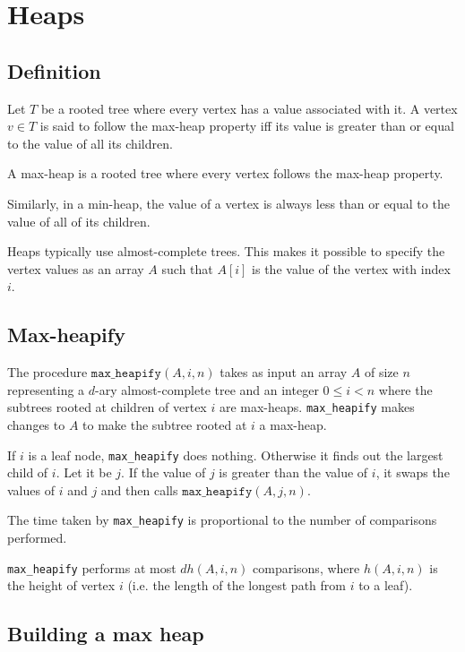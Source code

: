 \section{Heaps}

\subsection{Definition}

Let $T$ be a rooted tree where every vertex has a value associated with it.
A vertex $v \in T$ is said to follow the max-heap property iff
its value is greater than or equal to the value of all its children.

A max-heap is a rooted tree where every vertex follows the max-heap property.

Similarly, in a min-heap, the value of a vertex is always less than or equal to
the value of all of its children.

Heaps typically use almost-complete trees.
This makes it possible to specify the vertex values as an array $A$
such that $A[i]$ is the value of the vertex with index $i$.

\subsection{Max-heapify}

The procedure $\texttt{max\_heapify}(A, i, n)$ takes as input
an array $A$ of size $n$ representing a $d$-ary almost-complete tree
and an integer $0 \le i < n$ where
the subtrees rooted at children of vertex $i$ are max-heaps.
\texttt{max\_heapify} makes changes to $A$ to make the subtree rooted at $i$ a max-heap.

If $i$ is a leaf node, \texttt{max\_heapify} does nothing.
Otherwise it finds out the largest child of $i$. Let it be $j$.
If the value of $j$ is greater than the value of $i$,
it swaps the values of $i$ and $j$ and then calls $\texttt{max\_heapify}(A, j, n)$.

The time taken by \texttt{max\_heapify} is proportional to the number of comparisons performed.
\begin{theorem}
\texttt{\upshape max\_heapify} performs at most $dh(A, i, n)$ comparisons,
where $h(A, i, n)$ is the height of vertex $i$
(i.e. the length of the longest path from $i$ to a leaf).
\end{theorem}

\subsection{Building a max heap}

